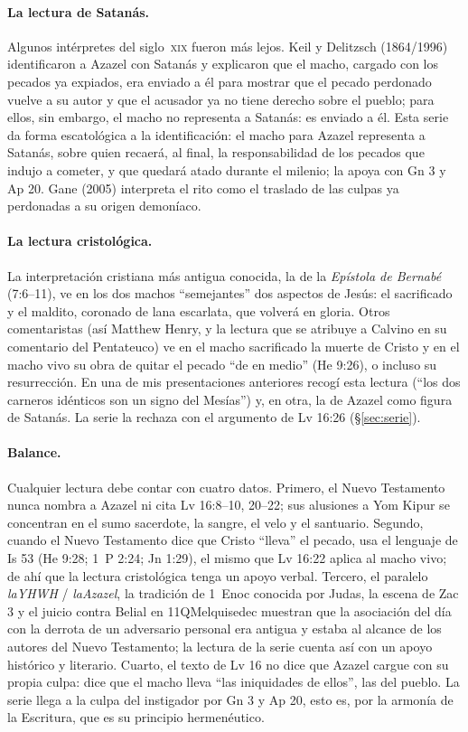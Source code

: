 \documentclass[11pt,letterpaper]{article}
\begin{document}
\paragraph{La lectura de Satanás.} Algunos intérpretes del siglo~\textsc{xix} fueron más lejos. Keil y Delitzsch (1864/1996) identificaron a Azazel con Satanás y explicaron que el macho, cargado con los pecados ya expiados, era enviado a él para mostrar que el pecado perdonado vuelve a su autor y que el acusador ya no tiene derecho sobre el pueblo; para ellos, sin embargo, el macho no representa a Satanás: es enviado a él. Esta serie da forma escatológica a la identificación: el macho para Azazel representa a Satanás, sobre quien recaerá, al final, la responsabilidad de los pecados que indujo a cometer, y que quedará atado durante el milenio; la apoya con Gn 3 y Ap 20. Gane (2005) interpreta el rito como el traslado de las culpas ya perdonadas a su origen demoníaco.

\paragraph{La lectura cristológica.} La interpretación cristiana más antigua conocida, la de la \emph{Epístola de Bernabé} (7:6--11), ve en los dos machos ``semejantes'' dos aspectos de Jesús: el sacrificado y el maldito, coronado de lana escarlata, que volverá en gloria. Otros comentaristas (así Matthew Henry, y la lectura que se atribuye a Calvino en su comentario del Pentateuco) ve en el macho sacrificado la muerte de Cristo y en el macho vivo su obra de quitar el pecado ``de en medio'' (He 9:26), o incluso su resurrección. En una de mis presentaciones anteriores recogí esta lectura (``los dos carneros idénticos son un signo del Mesías'') y, en otra, la de Azazel como figura de Satanás. La serie la rechaza con el argumento de Lv 16:26 (§\ref{sec:serie}).

\paragraph{Balance.} Cualquier lectura debe contar con cuatro datos. Primero, el Nuevo Testamento nunca nombra a Azazel ni cita Lv 16:8--10, 20--22; sus alusiones a Yom Kipur se concentran en el sumo sacerdote, la sangre, el velo y el santuario. Segundo, cuando el Nuevo Testamento dice que Cristo ``lleva'' el pecado, usa el lenguaje de Is 53 (He 9:28; 1~P 2:24; Jn 1:29), el mismo que Lv 16:22 aplica al macho vivo; de ahí que la lectura cristológica tenga un apoyo verbal. Tercero, el paralelo \emph{laYHWH} / \emph{laAzazel}, la tradición de 1~Enoc conocida por Judas, la escena de Zac 3 y el juicio contra Belial en 11QMelquisedec muestran que la asociación del día con la derrota de un adversario personal era antigua y estaba al alcance de los autores del Nuevo Testamento; la lectura de la serie cuenta así con un apoyo histórico y literario. Cuarto, el texto de Lv 16 no dice que Azazel cargue con su propia culpa: dice que el macho lleva ``las iniquidades de ellos'', las del pueblo. La serie llega a la culpa del instigador por Gn 3 y Ap 20, esto es, por la armonía de la Escritura, que es su principio hermenéutico.
\end{document}

